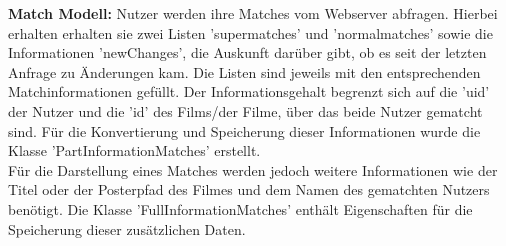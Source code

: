 \noindent
\textbf{Match Modell:}
Nutzer werden ihre Matches vom Webserver abfragen. Hierbei erhalten erhalten sie zwei Listen 'supermatches' und 'normalmatches' sowie die Informationen 'newChanges', die Auskunft darüber gibt, ob es seit der letzten Anfrage zu Änderungen kam. Die Listen sind jeweils mit den entsprechenden Matchinformationen gefüllt. Der Informationsgehalt begrenzt sich auf die 'uid' der Nutzer und die 'id' des Films/der Filme, über das beide Nutzer gematcht sind. Für die Konvertierung und Speicherung dieser Informationen wurde die Klasse 'PartInformationMatches' erstellt. \\
Für die Darstellung eines Matches werden jedoch weitere Informationen wie der Titel oder der Posterpfad des Filmes und dem Namen des gematchten Nutzers benötigt. Die Klasse 'FullInformationMatches' enthält Eigenschaften für die Speicherung dieser zusätzlichen Daten.
